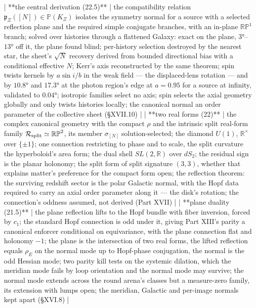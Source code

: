 | **the central derivation (22.5)** | the compatibility relation $\mathfrak p_\Xi([N])\in\mathbb P(K_\Xi)$ isolates the symmetry normal for a source with a selected reflection plane and the required simple conjugate branches, with an in-plane $\mathbb{RP}^1$ branch; solved over histories through a flattened Galaxy: exact on the plane, $3°$–$13°$ off it, the plane found blind; per-history selection destroyed by the nearest star, the sheet's $\sqrt N$ recovery derived from bounded directional bias with a conditional effective $N$; Kerr's axis reconstructed by the same theorem; spin twists kernels by $a\sin i/b$ in the weak field — the displaced-lens rotation — and by $10.8°$ and $17.3°$ at the photon region's edge at $a = 0.95$ for a source at infinity, validated to $0.04°$; isotropic families select no axis; spin selects the axial geometry globally and only twists histories locally; the canonical normal an order parameter of the collective sheet (§XVII.10) |
| **two real forms (22)** | the complex canonical geometry with the compact $\rho$ and the intrinsic split real-form family $\mathcal R_{\rm split}\simeq\mathbb{RP}^2$, its member $\sigma_{[N]}$ solution-selected; the diamond $U(1)$, $\mathbb R^\times$ over $\{\pm1\}$; one connection restricting to phase and to scale, the split curvature the hyperboloid's area form; the dual shell $SL(2,\mathbb R)$ over $dS_2$; the residual sign is the planar holonomy; the split form of split signature $(3,3)$, whether that explains matter's preference for the compact form open; the reflection theorem: the surviving redshift sector is the polar Galactic normal, with the Hopf data required to carry an axial order parameter along it — the disk's rotation; the connection's oddness assumed, not derived (Part XVII) |
| **plane duality (21.5)** | the plane reflection lifts to the Hopf bundle with fiber inversion, forced by $c_1$; the standard Hopf connection is odd under it, giving Part XIII's parity a canonical enforcer conditional on equivariance, with the plane connection flat and holonomy $-1$; the plane is the intersection of two real forms, the lifted reflection equals $\rho_E$ on the normal mode up to Hopf-phase conjugation, the normal is the odd Hessian mode; two parity kill tests on the systemic dilation, which the meridian mode fails by loop orientation and the normal mode may survive; the normal mode extends across the round arena's classes but a measure-zero family, its extension with lumps open; the meridian, Galactic and per-image normals kept apart (§XVI.8) |
